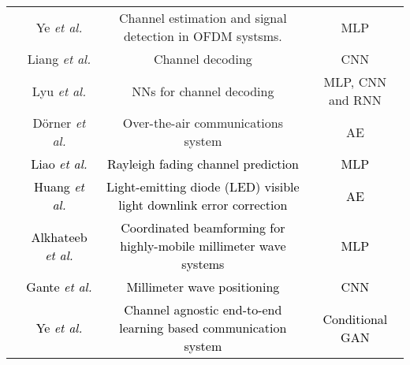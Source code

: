 \documentclass[journal,comsoc,letter]{IEEEtran}
\newcommand{\rev}[1]{\textcolor{black}{#1}}
\begin{document}
\begin{table*}[htb]
\begin{tabular}{|C{2CM}|C{3CM}|C{8CM}|C{3CM}|}
                               & Ye \emph{et al.} \cite{ye2018power}                               & Channel estimation and signal detection in OFDM systsms.            & MLP                              \\  
                               & Liang \emph{et al.} \cite{liang2018exploiting}                    & Channel decoding                                                    & CNN                              \\  
                               & Lyu \emph{et al.} \cite{lyu2018performance}                       & NNs for channel decoding                          & MLP, CNN and RNN                 \\  
                               & D{\"o}rner \emph{et al.} \cite{dorner2017deep}                    & Over-the-air communications system                          & AE                               \\ 
                               & \rev{Liao \emph{et al.} \cite{liao2018rayleigh}}                   & \rev{Rayleigh fading channel prediction}                             & \rev{MLP}                         \\ 
                               & \rev{Huang \emph{et al.} \cite{huang2018fully}}                   & \rev{Light-emitting diode (LED) visible light downlink error correction}                             & \rev{AE}                         \\
& \rev{Alkhateeb \emph{et al.} \cite{alkhateeb2018deep}}                   & \rev{Coordinated beamforming for highly-mobile millimeter wave systems}                             & \rev{MLP}                         \\ 
                               & \rev{Gante \emph{et al.} \cite{gante2018beamformed}}                   & \rev{Millimeter wave positioning}                             & \rev{CNN}                         \\ 
                               & \rev{Ye \emph{et al.} \cite{ye2018channel}}                   & \rev{Channel agnostic end-to-end learning based communication system}                             & \rev{Conditional GAN}                         \\\hline
\end{tabular}
\end{table*}
\end{document}
